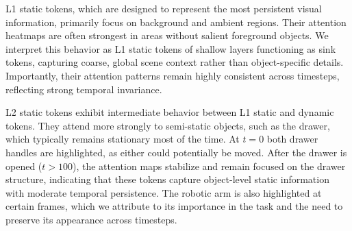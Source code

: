 L1 static tokens, which are designed to represent the most persistent visual information, primarily focus on background and ambient regions. Their attention heatmaps are often strongest in areas without salient foreground objects. We interpret this behavior as L1 static tokens of shallow layers functioning as sink tokens, capturing coarse, global scene context rather than object-specific details. Importantly, their attention patterns remain highly consistent across timesteps, reflecting strong temporal invariance.

L2 static tokens exhibit intermediate behavior between L1 static and dynamic tokens. They attend more strongly to semi-static objects, such as the drawer, which typically remains stationary most of the time. At $t=0$ both drawer handles are highlighted, as either could potentially be moved. After the drawer is opened ($t>100$), the attention maps stabilize and remain focused on the drawer structure, indicating that these tokens capture object-level static information with moderate temporal persistence. The robotic arm is also highlighted at certain frames, which we attribute to its importance in the task and the need to preserve its appearance across timesteps.

